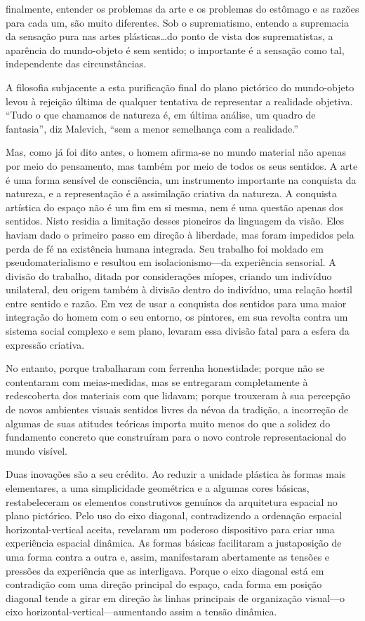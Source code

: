 \documentclass[a4paper]{article}
\begin{document}
finalmente, entender os problemas da arte e os problemas do estômago e as razões para cada um, são muito diferentes. Sob o suprematismo, entendo a supremacia da sensação pura nas artes plásticas\ldots do ponto de vista dos suprematistas, a aparência do mundo-objeto é sem sentido; o importante é a sensação como tal, independente das circunstâncias.

A filosofia subjacente a esta purificação final do plano pictórico do mundo-objeto levou à rejeição última de qualquer tentativa de representar a realidade objetiva. ``Tudo o que chamamos de natureza é, em última análise, um quadro de fantasia'', diz Malevich, ``sem a menor semelhança com a realidade.''

Mas, como já foi dito antes, o homem afirma-se no mundo material não apenas por meio do pensamento, mas também por meio de todos os seus sentidos. A arte é uma forma sensível de consciência, um instrumento importante na conquista da natureza, e a representação é a assimilação criativa da natureza. A conquista artística do espaço não é um fim em si mesma, nem é uma questão apenas dos sentidos. Nisto residia a limitação desses pioneiros da linguagem da visão. Eles haviam dado o primeiro passo em direção à liberdade, mas foram impedidos pela perda de fé na existência humana integrada. Seu trabalho foi moldado em pseudomaterialismo e resultou em isolacionismo---da experiência sensorial. A divisão do trabalho, ditada por considerações míopes, criando um indivíduo unilateral, deu origem também à divisão dentro do indivíduo, uma relação hostil entre sentido e razão. Em vez de usar a conquista dos sentidos para uma maior integração do homem com o seu entorno, os pintores, em sua revolta contra um sistema social complexo e sem plano, levaram essa divisão fatal para a esfera da expressão criativa.

No entanto, porque trabalharam com ferrenha honestidade; porque não se contentaram com meias-medidas, mas se entregaram completamente à redescoberta dos materiais com que lidavam; porque trouxeram à sua percepção de novos ambientes visuais sentidos livres da névoa da tradição, a incorreção de algumas de suas atitudes teóricas importa muito menos do que a solidez do fundamento concreto que construíram para o novo controle representacional do mundo visível.

Duas inovações são a seu crédito. Ao reduzir a unidade plástica às formas mais elementares, a uma simplicidade geométrica e a algumas cores básicas, restabeleceram os elementos construtivos genuínos da arquitetura espacial no plano pictórico. Pelo uso do eixo diagonal, contradizendo a ordenação espacial horizontal-vertical aceita, revelaram um poderoso dispositivo para criar uma experiência espacial dinâmica. As formas básicas facilitaram a justaposição de uma forma contra a outra e, assim, manifestaram abertamente as tensões e pressões da experiência que as interligava. Porque o eixo diagonal está em contradição com uma direção principal do espaço, cada forma em posição diagonal tende a girar em direção às linhas principais de organização visual---o eixo horizontal-vertical---aumentando assim a tensão dinâmica.
\end{document}
